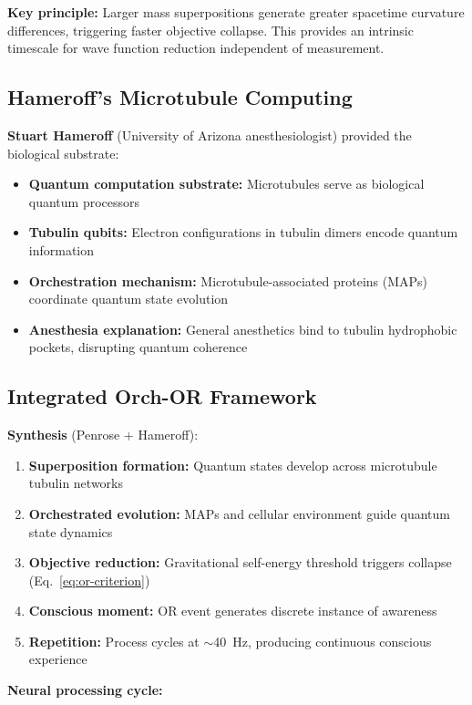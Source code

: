 \textbf{Key principle:} Larger mass superpositions generate greater spacetime curvature differences, triggering faster objective collapse. This provides an intrinsic timescale for wave function reduction independent of measurement.

\subsection{Hameroff's Microtubule Computing}

\textbf{Stuart Hameroff} (University of Arizona anesthesiologist) provided the biological substrate:

\begin{itemize}
\item \textbf{Quantum computation substrate:} Microtubules serve as biological quantum processors
\item \textbf{Tubulin qubits:} Electron configurations in tubulin dimers encode quantum information
\item \textbf{Orchestration mechanism:} Microtubule-associated proteins (MAPs) coordinate quantum state evolution
\item \textbf{Anesthesia explanation:} General anesthetics bind to tubulin hydrophobic pockets, disrupting quantum coherence
\end{itemize}

\subsection{Integrated Orch-OR Framework}

\textbf{Synthesis} (Penrose $+$ Hameroff):

\begin{enumerate}
\item \textbf{Superposition formation:} Quantum states develop across microtubule tubulin networks
\item \textbf{Orchestrated evolution:} MAPs and cellular environment guide quantum state dynamics
\item \textbf{Objective reduction:} Gravitational self-energy threshold triggers collapse (Eq.~\ref{eq:or-criterion})
\item \textbf{Conscious moment:} OR event generates discrete instance of awareness
\item \textbf{Repetition:} Process cycles at $\sim$40~Hz, producing continuous conscious experience
\end{enumerate}

\textbf{Neural processing cycle:}

